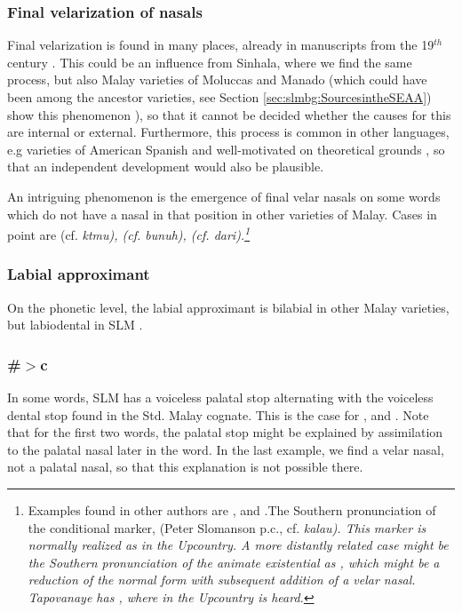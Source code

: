 \subsubsection{Final velarization of nasals}\label{sec:phon:Finalvelarizationofnasals}
Final velarization is found in many places, already in manuscripts from the 19$^{th}$ century \citep[120]{Hussainmiya1987}. This could be an influence from Sinhala, where we find the same process, but also Malay varieties of Moluccas and Manado (which could have been among the ancestor varieties, see Section \ref{sec:slmbg:SourcesintheSEAA}) show this phenomenon \citep{Adelaar1991,Paauw2004,SmithEtAl2004}), so that it cannot be decided whether the causes for this are internal or external. Furthermore, this process is common in other languages, e.g varieties of American Spanish
\citep[10f]{Hualde2005} and well-motivated on theoretical grounds \citep[322ff]{Botma2004}, so that an independent development would also be plausible.

An intriguing phenomenon is the emergence of final velar nasals on some words which do not have a nasal in that position in other varieties of Malay. Cases in point are
 (cf. \em k\E t\E mu\em),
 (cf. \em bunuh\em),
 (cf. \em dari\em).\footnote{Examples found in other authors are ,  and  .The Southern pronunciation of the conditional marker,  (Peter Slomanson p.c., cf. \em kalau\em).
This marker is normally realized as  in the Upcountry.  A more distantly related case might be the Southern pronunciation of the animate existential as  \citep{Slomanson2008ismil}, which might be a reduction of the normal form  with subsequent addition of a velar nasal. Tapovanaye has , where in the Upcountry  is heard.}

\subsubsection{Labial approximant}
On the phonetic level, the labial approximant is bilabial in other Malay varieties, but labiodental in SLM \citep{Bichsel, SmithEtAl2004}.

\subsubsection{\#\dentt$>$c}
In some words, SLM has a voiceless palatal stop alternating with the voiceless dental stop found in the Std. Malay cognate. This is the case for ,  and . Note that for the first two words, the palatal stop might be explained by assimilation to the  palatal nasal later in the word. In the last example, we find a velar nasal, not a palatal nasal, so that this explanation is not possible there.

